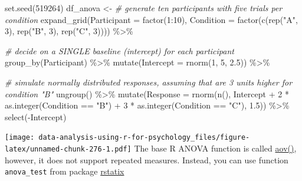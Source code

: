 \documentclass[
]{book}
\newenvironment{Shaded}{\begin{snugshade}}{\end{snugshade}}
\newcommand{\AttributeTok}[1]{\textcolor[rgb]{0.77,0.63,0.00}{#1}}
\newcommand{\CommentTok}[1]{\textcolor[rgb]{0.56,0.35,0.01}{\textit{#1}}}
\newcommand{\DecValTok}[1]{\textcolor[rgb]{0.00,0.00,0.81}{#1}}
\newcommand{\FloatTok}[1]{\textcolor[rgb]{0.00,0.00,0.81}{#1}}
\newcommand{\FunctionTok}[1]{\textcolor[rgb]{0.00,0.00,0.00}{#1}}
\newcommand{\NormalTok}[1]{#1}
\newcommand{\OtherTok}[1]{\textcolor[rgb]{0.56,0.35,0.01}{#1}}
\newcommand{\SpecialCharTok}[1]{\textcolor[rgb]{0.00,0.00,0.00}{#1}}
\newcommand{\StringTok}[1]{\textcolor[rgb]{0.31,0.60,0.02}{#1}}
\begin{document}
\begin{Shaded}
\begin{Highlighting}[]
\FunctionTok{set.seed}\NormalTok{(}\DecValTok{519264}\NormalTok{)}
\NormalTok{df\_anova }\OtherTok{\textless{}{-}}
  \CommentTok{\# generate ten participants with five trials per condition}
  \FunctionTok{expand\_grid}\NormalTok{(}\AttributeTok{Participant  =} \FunctionTok{factor}\NormalTok{(}\DecValTok{1}\SpecialCharTok{:}\DecValTok{10}\NormalTok{),}
              \AttributeTok{Condition =} \FunctionTok{factor}\NormalTok{(}\FunctionTok{c}\NormalTok{(}\FunctionTok{rep}\NormalTok{(}\StringTok{"A"}\NormalTok{, }\DecValTok{3}\NormalTok{), }\FunctionTok{rep}\NormalTok{(}\StringTok{"B"}\NormalTok{, }\DecValTok{3}\NormalTok{), }\FunctionTok{rep}\NormalTok{(}\StringTok{"C"}\NormalTok{, }\DecValTok{3}\NormalTok{)))) }\SpecialCharTok{\%\textgreater{}\%}
  
  \CommentTok{\# decide on a SINGLE baseline (intercept) for each participant}
  \FunctionTok{group\_by}\NormalTok{(Participant) }\SpecialCharTok{\%\textgreater{}\%}
  \FunctionTok{mutate}\NormalTok{(}\AttributeTok{Intercept =} \FunctionTok{rnorm}\NormalTok{(}\DecValTok{1}\NormalTok{, }\DecValTok{5}\NormalTok{, }\FloatTok{2.5}\NormalTok{)) }\SpecialCharTok{\%\textgreater{}\%}
  
  \CommentTok{\# simulate normally distributed responses, assuming that are 3 units higher for condition "B"}
  \FunctionTok{ungroup}\NormalTok{() }\SpecialCharTok{\%\textgreater{}\%}
  \FunctionTok{mutate}\NormalTok{(}\AttributeTok{Response =} \FunctionTok{rnorm}\NormalTok{(}\FunctionTok{n}\NormalTok{(), Intercept }\SpecialCharTok{+} \DecValTok{2} \SpecialCharTok{*} \FunctionTok{as.integer}\NormalTok{(Condition }\SpecialCharTok{==} \StringTok{"B"}\NormalTok{) }\SpecialCharTok{+} \DecValTok{3} \SpecialCharTok{*} \FunctionTok{as.integer}\NormalTok{(Condition }\SpecialCharTok{==} \StringTok{"C"}\NormalTok{), }\FloatTok{1.5}\NormalTok{)) }\SpecialCharTok{\%\textgreater{}\%}
  \FunctionTok{select}\NormalTok{(}\SpecialCharTok{{-}}\NormalTok{Intercept)}
\end{Highlighting}
\end{Shaded}

\texttt{[image: data-analysis-using-r-for-psychology\_files/figure-latex/unnamed-chunk-276-1.pdf]}
The base R ANOVA function is called \href{https://stat.ethz.ch/R-manual/R-devel/library/stats/html/aov.html}{aov()}, however, it does not support repeated measures. Instead, you can use function \texttt{anova\_test} from package \href{https://github.com/kassambara/rstatix}{rstatix}
\end{document}
